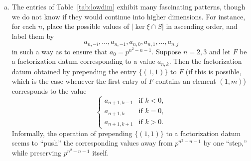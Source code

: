 \begin{rem}
\begin{enumerate}[(a)]
\item The entries of Table~\ref{tab:lowdim} exhibit many fascinating patterns, though we do not know if they would continue into higher dimensions. For instance, for each $n$, place the possible values of $|\ker\xi\cap S|$ in ascending order, and label them by
\begin{equation*}
a_{n,-i},\ldots,a_{n,-1},a_{n,0},a_{n,1},\ldots,a_{n,j}
\end{equation*}
in such a way as to ensure that $a_0=p^{n^2-n-1}$. Suppose $n=2,3$ and let $F$ be a factorization datum corresponding to a value $a_{n,k}$. Then the factorization datum obtained by prepending the entry $\{(1,1)\}$ to $F$ (if this is possible, which is the case whenever the first entry of $F$ contains an element $(1,m)$) corresponds to the value
\begin{equation*}
\begin{cases}
a_{n+1,k-1}&\text{if }k<0,\\
a_{n+1,k}&\text{if }k=0,\\
a_{n+1,k+1}&\text{if }k>0.
\end{cases}
\end{equation*}
Informally, the operation of prepending $\{(1,1)\}$ to a factorization datum seems to ``push'' the corresponding values away from $p^{n^2-n-1}$ by one ``step,'' while preserving $p^{n^2-n-1}$ itself.
\end{enumerate}
\end{rem}


